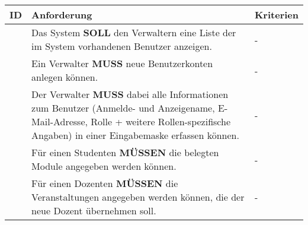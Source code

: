 \begin{tabular} {|p{}|p{}|p{}|}
	\hline
	ID & Anforderung & Kriterien \\
	\hline
	\printfreqnr
	& Das System \textbf{SOLL} den Verwaltern eine Liste der im System vorhandenen Benutzer anzeigen.
	& - \\ 
	\hline
	\printfreqnr
	& Ein Verwalter \textbf{MUSS} neue Benutzerkonten anlegen können. 
	& - \\
	\hline
	\printfreqnr
	& Der Verwalter \textbf{MUSS} dabei alle Informationen zum Benutzer (Anmelde- und Anzeigename, E-Mail-Adresse, Rolle + weitere Rollen-spezifische Angaben) in einer Eingabemaske erfassen können.
	& - \\ 
	\hline
	\printfreqnr
	& Für einen Studenten \textbf{MÜSSEN} die belegten Module angegeben werden können.
	& - \\ 
	\hline
	\printfreqnr
	& Für einen Dozenten \textbf{MÜSSEN} die Veranstaltungen angegeben werden können, die der neue Dozent übernehmen soll.
	& - \\ 
	\hline
\end{tabular}

\newpage

